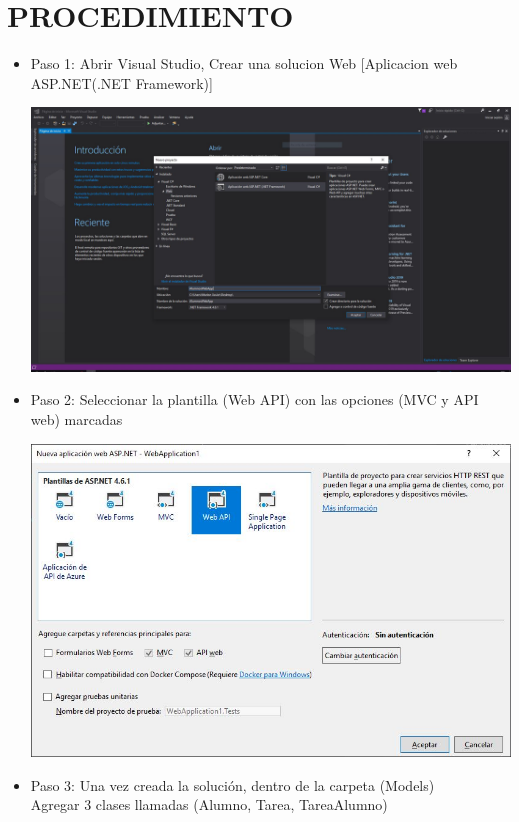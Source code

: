 \section{PROCEDIMIENTO} 
\begin{itemize}
	\item Paso 1: Abrir Visual Studio, Crear una solucion Web  [Aplicacion web ASP.NET(.NET Framework)]\\
		\begin{center}
		\includegraphics[width=15cm]{./Imagenes/Captura1}
		\end{center}
	\item Paso 2: Seleccionar la plantilla (Web API) con las opciones (MVC  y API web) marcadas\\
	\begin{center}
		\includegraphics[width=15cm]{./Imagenes/Captura2}
		\end{center}
	\item Paso 3: Una vez creada la solución, dentro de la carpeta (Models)\\ Agregar 3 clases llamadas (Alumno, Tarea, TareaAlumno)\\

\end{itemize}
